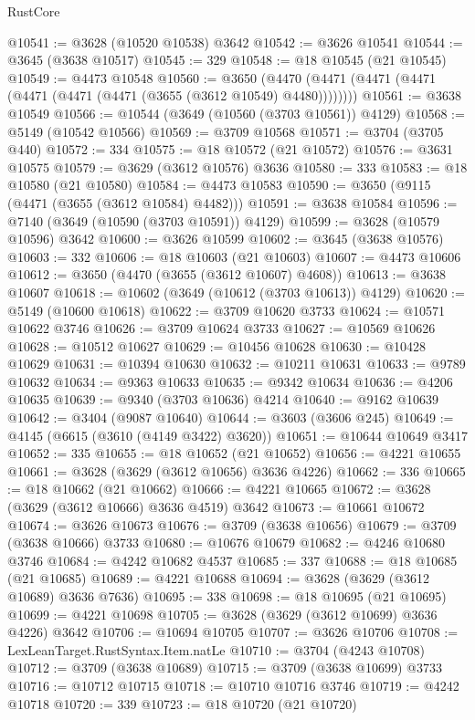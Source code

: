 \begin{lexlean}{RustCore}
\begin{coremodule}
@10541 := @3628 (@10520 @10538) @3642
@10542 := @3626 @10541
@10544 := @3645 (@3638 @10517)
@10545 := 329
@10548 := @18 @10545 (@21 @10545)
@10549 := @4473 @10548
@10560 := @3650 (@4470 (@4471 (@4471 (@4471 (@4471 (@4471 (@4471 (@3655 (@3612 @10549) @4480))))))))
@10561 := @3638 @10549
@10566 := @10544 (@3649 (@10560 (@3703 @10561)) @4129)
@10568 := @5149 (@10542 @10566)
@10569 := @3709 @10568
@10571 := @3704 (@3705 @440)
@10572 := 334
@10575 := @18 @10572 (@21 @10572)
@10576 := @3631 @10575
@10579 := @3629 (@3612 @10576) @3636
@10580 := 333
@10583 := @18 @10580 (@21 @10580)
@10584 := @4473 @10583
@10590 := @3650 (@9115 (@4471 (@3655 (@3612 @10584) @4482)))
@10591 := @3638 @10584
@10596 := @7140 (@3649 (@10590 (@3703 @10591)) @4129)
@10599 := @3628 (@10579 @10596) @3642
@10600 := @3626 @10599
@10602 := @3645 (@3638 @10576)
@10603 := 332
@10606 := @18 @10603 (@21 @10603)
@10607 := @4473 @10606
@10612 := @3650 (@4470 (@3655 (@3612 @10607) @4608))
@10613 := @3638 @10607
@10618 := @10602 (@3649 (@10612 (@3703 @10613)) @4129)
@10620 := @5149 (@10600 @10618)
@10622 := @3709 @10620 @3733
@10624 := @10571 @10622 @3746
@10626 := @3709 @10624 @3733
@10627 := @10569 @10626
@10628 := @10512 @10627
@10629 := @10456 @10628
@10630 := @10428 @10629
@10631 := @10394 @10630
@10632 := @10211 @10631
@10633 := @9789 @10632
@10634 := @9363 @10633
@10635 := @9342 @10634
@10636 := @4206 @10635
@10639 := @9340 (@3703 @10636) @4214
@10640 := @9162 @10639
@10642 := @3404 (@9087 @10640)
@10644 := @3603 (@3606 @245)
@10649 := @4145 (@6615 (@3610 (@4149 @3422) @3620))
@10651 := @10644 @10649 @3417
@10652 := 335
@10655 := @18 @10652 (@21 @10652)
@10656 := @4221 @10655
@10661 := @3628 (@3629 (@3612 @10656) @3636 @4226)
@10662 := 336
@10665 := @18 @10662 (@21 @10662)
@10666 := @4221 @10665
@10672 := @3628 (@3629 (@3612 @10666) @3636 @4519) @3642
@10673 := @10661 @10672
@10674 := @3626 @10673
@10676 := @3709 (@3638 @10656)
@10679 := @3709 (@3638 @10666) @3733
@10680 := @10676 @10679
@10682 := @4246 @10680 @3746
@10684 := @4242 @10682 @4537
@10685 := 337
@10688 := @18 @10685 (@21 @10685)
@10689 := @4221 @10688
@10694 := @3628 (@3629 (@3612 @10689) @3636 @7636)
@10695 := 338
@10698 := @18 @10695 (@21 @10695)
@10699 := @4221 @10698
@10705 := @3628 (@3629 (@3612 @10699) @3636 @4226) @3642
@10706 := @10694 @10705
@10707 := @3626 @10706
@10708 := LexLeanTarget.RustSyntax.Item.natLe
@10710 := @3704 (@4243 @10708)
@10712 := @3709 (@3638 @10689)
@10715 := @3709 (@3638 @10699) @3733
@10716 := @10712 @10715
@10718 := @10710 @10716 @3746
@10719 := @4242 @10718
@10720 := 339
@10723 := @18 @10720 (@21 @10720)

\end{coremodule}
\end{lexlean}
